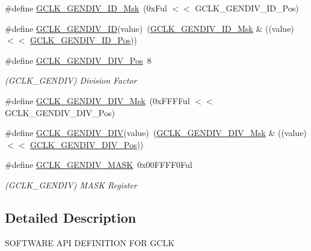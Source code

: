 \begin{DoxyCompactItemize}
\#define \mbox{\hyperlink{group___s_a_m_d21___g_c_l_k_ga5a0c53611d4a82e0c2dbb7b6f4a19d01}{G\+C\+L\+K\+\_\+\+G\+E\+N\+D\+I\+V\+\_\+\+I\+D\+\_\+\+Msk}}~(0x\+Ful $<$$<$ G\+C\+L\+K\+\_\+\+G\+E\+N\+D\+I\+V\+\_\+\+I\+D\+\_\+\+Pos)
\item 
\#define \mbox{\hyperlink{group___s_a_m_d21___g_c_l_k_ga121c30a908238bacb3fefa4e5b301aa5}{G\+C\+L\+K\+\_\+\+G\+E\+N\+D\+I\+V\+\_\+\+ID}}(value)~(\mbox{\hyperlink{group___s_a_m_d21___g_c_l_k_ga5a0c53611d4a82e0c2dbb7b6f4a19d01}{G\+C\+L\+K\+\_\+\+G\+E\+N\+D\+I\+V\+\_\+\+I\+D\+\_\+\+Msk}} \& ((value) $<$$<$ \mbox{\hyperlink{group___s_a_m_d21___g_c_l_k_ga26ff4637fd9d6b561a910aeee96a4f88}{G\+C\+L\+K\+\_\+\+G\+E\+N\+D\+I\+V\+\_\+\+I\+D\+\_\+\+Pos}}))
\item 
\#define \mbox{\hyperlink{group___s_a_m_d21___g_c_l_k_ga182a17bda5373cb761e1bee891a03477}{G\+C\+L\+K\+\_\+\+G\+E\+N\+D\+I\+V\+\_\+\+D\+I\+V\+\_\+\+Pos}}~8
\begin{DoxyCompactList}\small\item\em (G\+C\+L\+K\+\_\+\+G\+E\+N\+D\+IV) Division Factor \end{DoxyCompactList}\item 
\#define \mbox{\hyperlink{group___s_a_m_d21___g_c_l_k_gae95d79b8cfc28a501dce0f4767e20dc7}{G\+C\+L\+K\+\_\+\+G\+E\+N\+D\+I\+V\+\_\+\+D\+I\+V\+\_\+\+Msk}}~(0x\+F\+F\+F\+Ful $<$$<$ G\+C\+L\+K\+\_\+\+G\+E\+N\+D\+I\+V\+\_\+\+D\+I\+V\+\_\+\+Pos)
\item 
\#define \mbox{\hyperlink{group___s_a_m_d21___g_c_l_k_ga030bddfec3401b61cabd3fd51b98624d}{G\+C\+L\+K\+\_\+\+G\+E\+N\+D\+I\+V\+\_\+\+D\+IV}}(value)~(\mbox{\hyperlink{group___s_a_m_d21___g_c_l_k_gae95d79b8cfc28a501dce0f4767e20dc7}{G\+C\+L\+K\+\_\+\+G\+E\+N\+D\+I\+V\+\_\+\+D\+I\+V\+\_\+\+Msk}} \& ((value) $<$$<$ \mbox{\hyperlink{group___s_a_m_d21___g_c_l_k_ga182a17bda5373cb761e1bee891a03477}{G\+C\+L\+K\+\_\+\+G\+E\+N\+D\+I\+V\+\_\+\+D\+I\+V\+\_\+\+Pos}}))
\item 
\#define \mbox{\hyperlink{group___s_a_m_d21___g_c_l_k_gaf693b6342bd310d59956220a059f6e4a}{G\+C\+L\+K\+\_\+\+G\+E\+N\+D\+I\+V\+\_\+\+M\+A\+SK}}~0x00\+F\+F\+F\+F0\+Ful
\begin{DoxyCompactList}\small\item\em (G\+C\+L\+K\+\_\+\+G\+E\+N\+D\+IV) M\+A\+SK Register \end{DoxyCompactList}\end{DoxyCompactItemize}


\subsection{Detailed Description}
S\+O\+F\+T\+W\+A\+RE A\+PI D\+E\+F\+I\+N\+I\+T\+I\+ON F\+OR G\+C\+LK 

